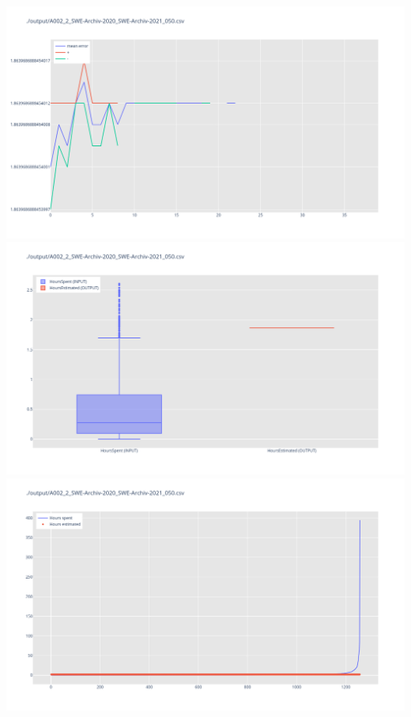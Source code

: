 \includegraphics[width=\textwidth]{Scripts/output/A002_2_SWE-Archiv-2020_SWE-Archiv-2021_050.csv.error_distribution.png}
\includegraphics[width=\textwidth]{Scripts/output/A002_2_SWE-Archiv-2020_SWE-Archiv-2021_050.csv.png}
\includegraphics[width=\textwidth]{Scripts/output/A002_2_SWE-Archiv-2020_SWE-Archiv-2021_050.csv.scatter.png}
